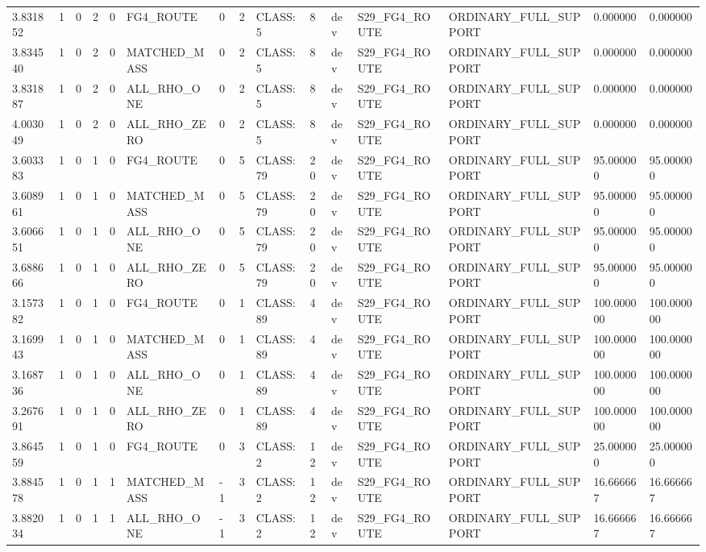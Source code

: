 \begin{tabular}{lllllllllllllll}
3.831852 & 1 & 0 & 2 & 0 & FG4\_ROUTE & 0 & 2 & CLASS:5 & 8 & dev & S29\_FG4\_ROUTE & ORDINARY\_FULL\_SUPPORT & 0.000000 & 0.000000 \\
3.834540 & 1 & 0 & 2 & 0 & MATCHED\_MASS & 0 & 2 & CLASS:5 & 8 & dev & S29\_FG4\_ROUTE & ORDINARY\_FULL\_SUPPORT & 0.000000 & 0.000000 \\
3.831887 & 1 & 0 & 2 & 0 & ALL\_RHO\_ONE & 0 & 2 & CLASS:5 & 8 & dev & S29\_FG4\_ROUTE & ORDINARY\_FULL\_SUPPORT & 0.000000 & 0.000000 \\
4.003049 & 1 & 0 & 2 & 0 & ALL\_RHO\_ZERO & 0 & 2 & CLASS:5 & 8 & dev & S29\_FG4\_ROUTE & ORDINARY\_FULL\_SUPPORT & 0.000000 & 0.000000 \\
3.603383 & 1 & 0 & 1 & 0 & FG4\_ROUTE & 0 & 5 & CLASS:79 & 20 & dev & S29\_FG4\_ROUTE & ORDINARY\_FULL\_SUPPORT & 95.000000 & 95.000000 \\
3.608961 & 1 & 0 & 1 & 0 & MATCHED\_MASS & 0 & 5 & CLASS:79 & 20 & dev & S29\_FG4\_ROUTE & ORDINARY\_FULL\_SUPPORT & 95.000000 & 95.000000 \\
3.606651 & 1 & 0 & 1 & 0 & ALL\_RHO\_ONE & 0 & 5 & CLASS:79 & 20 & dev & S29\_FG4\_ROUTE & ORDINARY\_FULL\_SUPPORT & 95.000000 & 95.000000 \\
3.688666 & 1 & 0 & 1 & 0 & ALL\_RHO\_ZERO & 0 & 5 & CLASS:79 & 20 & dev & S29\_FG4\_ROUTE & ORDINARY\_FULL\_SUPPORT & 95.000000 & 95.000000 \\
3.157382 & 1 & 0 & 1 & 0 & FG4\_ROUTE & 0 & 1 & CLASS:89 & 4 & dev & S29\_FG4\_ROUTE & ORDINARY\_FULL\_SUPPORT & 100.000000 & 100.000000 \\
3.169943 & 1 & 0 & 1 & 0 & MATCHED\_MASS & 0 & 1 & CLASS:89 & 4 & dev & S29\_FG4\_ROUTE & ORDINARY\_FULL\_SUPPORT & 100.000000 & 100.000000 \\
3.168736 & 1 & 0 & 1 & 0 & ALL\_RHO\_ONE & 0 & 1 & CLASS:89 & 4 & dev & S29\_FG4\_ROUTE & ORDINARY\_FULL\_SUPPORT & 100.000000 & 100.000000 \\
3.267691 & 1 & 0 & 1 & 0 & ALL\_RHO\_ZERO & 0 & 1 & CLASS:89 & 4 & dev & S29\_FG4\_ROUTE & ORDINARY\_FULL\_SUPPORT & 100.000000 & 100.000000 \\
3.864559 & 1 & 0 & 1 & 0 & FG4\_ROUTE & 0 & 3 & CLASS:2 & 12 & dev & S29\_FG4\_ROUTE & ORDINARY\_FULL\_SUPPORT & 25.000000 & 25.000000 \\
3.884578 & 1 & 0 & 1 & 1 & MATCHED\_MASS & -1 & 3 & CLASS:2 & 12 & dev & S29\_FG4\_ROUTE & ORDINARY\_FULL\_SUPPORT & 16.666667 & 16.666667 \\
3.882034 & 1 & 0 & 1 & 1 & ALL\_RHO\_ONE & -1 & 3 & CLASS:2 & 12 & dev & S29\_FG4\_ROUTE & ORDINARY\_FULL\_SUPPORT & 16.666667 & 16.666667 \\

\end{tabular}
